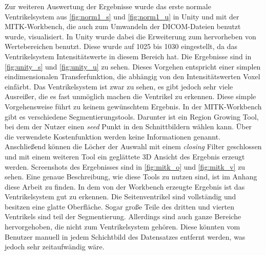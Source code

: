Zur weiteren Auswertung der Ergebnisse wurde das erste normale Ventrikelsystem aus \autoref{fig:norm1_s} und \autoref{fig:norm1_u} in Unity und mit der MITK-Workbench, die auch zum Umwandeln der DICOM-Dateien benutzt wurde, visualisiert.
\newline
In Unity wurde dabei die Erweiterung zum hervorheben von Wertebereichen benutzt. Diese wurde auf 1025 bis 1030 eingestellt, da das Ventrikelsystem Intensitätswerte in diesem Bereich hat. Die Ergebnisse sind in \autoref{fig:unity_s} und \autoref{fig:unity_u} zu sehen. Dieses Vorgehen entspricht einer simplen eindimensionalen Transferfunktion, die abhängig von den Intensitätswerten Voxel einfärbt.
\newline
Das Ventrikelsystem ist zwar zu sehen, es gibt jedoch sehr viele Ausreißer, die es fast unmöglich machen die Ventrikel zu erkennen. Diese simple Vorgehensweise führt zu keinem gewünschtem Ergebnis.
\newline
In der MITK-Workbench gibt es verschiedene Segmentierungstools. Darunter ist ein Region Growing Tool, bei dem der Nutzer einen \textit{seed} Punkt in den Schnittbildern wählen kann. Über die verwendete Kostenfunktion werden keine Informationen genannt. Anschließend können die Löcher der Auswahl mit einem \textit{closing} Filter geschlossen und mit einem weiteren Tool ein geglättete 3D Ansicht des Ergebnis erzeugt werden. Screenshots des Ergebnisses sind in \autoref{fig:mitk_o} und \autoref{fig:mitk_v} zu sehen. Eine genaue Beschreibung, wie diese Tools zu nutzen sind, ist im Anhang diese Arbeit zu finden.
\newline
In dem von der Workbench erzeugte Ergebnis ist das Ventrikelsystem gut zu erkennen. Die Seitenventrikel sind vollständig und besitzen eine glatte Oberfläche. Sogar große Teile des dritten und vierten Ventrikels sind teil der Segmentierung. Allerdings sind auch ganze Bereiche hervorgehoben, die nicht zum Ventrikelsystem gehören. Diese könnten vom Benutzer manuell in jedem Schichtbild des Datensatzes entfernt werden, was jedoch sehr zeitaufwändig wäre.


